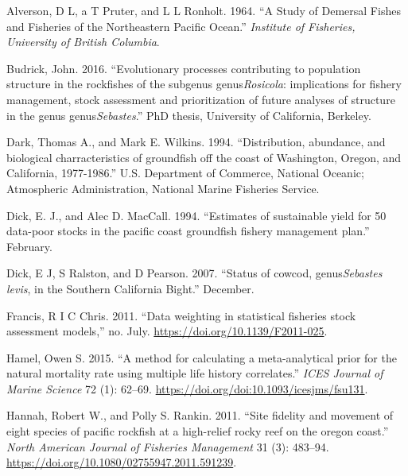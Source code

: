 \documentclass[11pt,
  english,
  a4paper,
]{article}
\newlength{\cslhangindent}
\newenvironment{CSLReferences}[2] %
 {%
  \setlength{\parindent}{0pt}
  \ifodd #1 \everypar{\setlength{\hangindent}{\cslhangindent}}\ignorespaces\fi
  \ifnum #2 > 0
  \setlength{\parskip}{#2\baselineskip}
  \fi
 }%
 {}
\begin{document}
\FloatBarrier

\hypertarget{refs}{}
\begin{CSLReferences}{1}{0}
\leavevmode{}%
Alverson, D L, a T Pruter, and L L Ronholt. 1964. {``{A Study of Demersal Fishes and Fisheries of the Northeastern Pacific Ocean}.''} \emph{Institute of Fisheries, University of British Columbia}.

\leavevmode{}%
Budrick, John. 2016. {``{Evolutionary processes contributing to population structure in the rockfishes of the subgenus genus\emph{Rosicola}: implications for fishery management, stock assessment and prioritization of future analyses of structure in the genus genus\emph{Sebastes}.}''} PhD thesis, University of California, Berkeley.

\leavevmode{}%
Dark, Thomas A., and Mark E. Wilkins. 1994. {``{Distribution, abundance, and biological charracteristics of groundfish off the coast of Washington, Oregon, and California, 1977-1986}.''} U.S. Department of Commerce, National Oceanic; Atmospheric Administration, National Marine Fisheries Service.

\leavevmode{}%
Dick, E. J., and Alec D. MacCall. 1994. {``{Estimates of sustainable yield for 50 data-poor stocks in the pacific coast groundfish fishery management plan}.''} February.

\leavevmode{}%
Dick, E J, S Ralston, and D Pearson. 2007. {``{Status of cowcod, genus\emph{Sebastes levis}, in the Southern California Bight}.''} December.

\leavevmode{}%
Francis, R I C Chris. 2011. {``{Data weighting in statistical fisheries stock assessment models},''} no. July. \url{https://doi.org/10.1139/F2011-025}.

\leavevmode{}%
Hamel, Owen S. 2015. {``{A method for calculating a meta-analytical prior for the natural mortality rate using multiple life history correlates}.''} \emph{ICES Journal of Marine Science} 72 (1): 62--69. \url{https://doi.org/doi:10.1093/icesjms/fsu131}.

\leavevmode{}%
Hannah, Robert W., and Polly S. Rankin. 2011. {``{Site fidelity and movement of eight species of pacific rockfish at a high-relief rocky reef on the oregon coast}.''} \emph{North American Journal of Fisheries Management} 31 (3): 483--94. \url{https://doi.org/10.1080/02755947.2011.591239}.


\end{CSLReferences}
\end{document}

